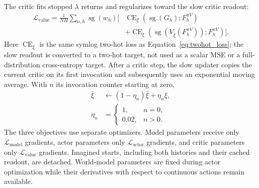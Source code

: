 \documentclass{article}
\begin{document}
The critic fits stopped $\lambda$ returns and regularizes toward the slow critic readout:
\begin{equation}
\begin{split}
\mathcal L_{\mathrm{value}}=\frac1{NH}\sum_{n,h}\operatorname{sg}(w_h)\big[&
\operatorname{CE}_{\xi}(\operatorname{sg}(G_h);F_h^{\pi V})\\
&+\operatorname{CE}_{\xi}(\operatorname{sg}(V_{\bar\xi}(F_h^{\pi V}));F_h^{\pi V})\big].
\end{split}
\label{eq:value_loss}
\end{equation}
Here $\operatorname{CE}_\xi$ is the same symlog two-hot loss as Equation~\eqref{eq:twohot_loss}; the slow readout is converted to a two-hot target, not used as a scalar MSE or a full-distribution cross-entropy target. After a critic step, the slow updater copies the current critic on its first invocation and subsequently uses an exponential moving average. With $n$ its invocation counter starting at zero,
\begin{equation}
\begin{aligned}
\bar\xi&\leftarrow(1-\eta_n)\bar\xi+\eta_n\xi,\\
\eta_n&=\begin{cases}1,&n=0,\\0.02,&n>0.\end{cases}
\end{aligned}
\label{eq:slow_value_update}
\end{equation}
The three objectives use separate optimizers. Model parameters receive only $\mathcal L_{\mathrm{model}}$ gradients, actor parameters only $\mathcal L_{\mathrm{actor}}$ gradients, and critic parameters only $\mathcal L_{\mathrm{value}}$ gradients. Imagined starts, including both histories and their cached readout, are detached. World-model parameters are fixed during actor optimization while their derivatives with respect to continuous actions remain available.
\end{document}
